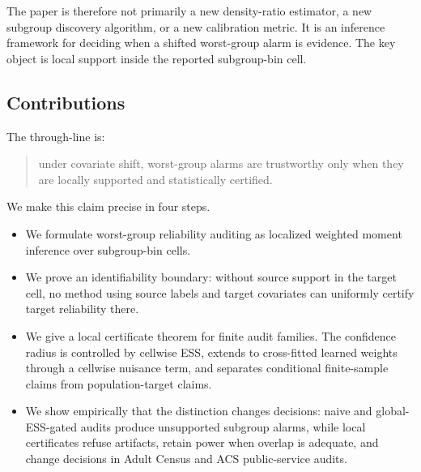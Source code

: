 The paper is therefore not primarily a new density-ratio estimator, a new subgroup discovery algorithm, or a new calibration metric. It is an inference framework for deciding when a shifted worst-group alarm is evidence. The key object is local support inside the reported subgroup-bin cell.

\subsection{Contributions}

The through-line is:
\begin{quote}
under covariate shift, worst-group alarms are trustworthy only when they are locally supported and statistically certified.
\end{quote}

We make this claim precise in four steps.

\begin{itemize}
  \item We formulate worst-group reliability auditing as localized weighted moment inference over subgroup-bin cells.
  \item We prove an identifiability boundary: without source support in the target cell, no method using source labels and target covariates can uniformly certify target reliability there.
  \item We give a local certificate theorem for finite audit families. The confidence radius is controlled by cellwise ESS, extends to cross-fitted learned weights through a cellwise nuisance term, and separates conditional finite-sample claims from population-target claims.
  \item We show empirically that the distinction changes decisions: naive and global-ESS-gated audits produce unsupported subgroup alarms, while local certificates refuse artifacts, retain power when overlap is adequate, and change decisions in Adult Census and ACS public-service audits.
\end{itemize}
